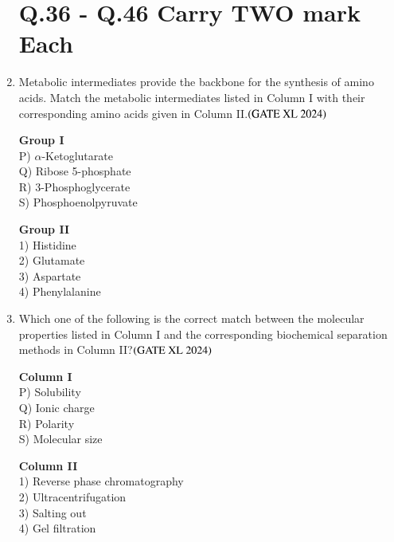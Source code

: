 \documentclass[journal]{IEEEtran}
\begin{document}
\begin{enumerate}
\section*{Q.36 - Q.46 Carry TWO mark Each}

    \item Metabolic intermediates provide the backbone for the synthesis of amino acids. Match the metabolic intermediates listed in Column I with their corresponding amino acids given in Column II.\hfill $\left(\text{GATE XL 2024}\right)$
    \begin{multicols}{2}
    \noindent \textbf{Group I} \\
    P) $\alpha$-Ketoglutarate \\
    Q) Ribose 5-phosphate \\
    R) 3-Phosphoglycerate \\
    S) Phosphoenolpyruvate \\

    \columnbreak

    \noindent \textbf{Group II} \\
    1) Histidine \\
    2) Glutamate \\
    3) Aspartate \\
    4) Phenylalanine \\
    \end{multicols}

    \item Which one of the following is the correct match between the molecular properties listed in Column I and the corresponding biochemical separation methods in Column II?\hfill $\left(\text{GATE XL 2024}\right)$
    \begin{multicols}{2}
    \noindent \textbf{Column I} \\
    P) Solubility \\
    Q) Ionic charge \\
    R) Polarity \\
    S) Molecular size \\

    \columnbreak

    \noindent \textbf{Column II} \\
    1) Reverse phase chromatography \\
    2) Ultracentrifugation \\
    3) Salting out \\
    4) Gel filtration \\
    \end{multicols}


\end{enumerate}
\end{document}
